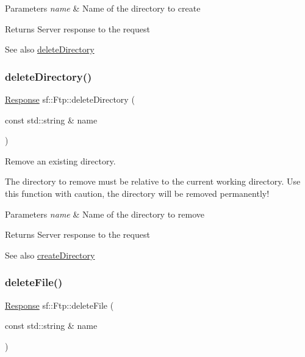 \begin{DoxyParams}{Parameters}
{\em name} & Name of the directory to create\\
\hline
\end{DoxyParams}
\begin{DoxyReturn}{Returns}
Server response to the request
\end{DoxyReturn}
\begin{DoxySeeAlso}{See also}
\hyperlink{classsf_1_1_ftp_a2a8a7ef9144204b5b319c9a4be8806c2}{delete\+Directory} 
\end{DoxySeeAlso}
\mbox{\label{classsf_1_1_ftp_a2a8a7ef9144204b5b319c9a4be8806c2}} 
\subsubsection{\texorpdfstring{delete\+Directory()}{deleteDirectory()}}
{\footnotesize\ttfamily \hyperlink{classsf_1_1_ftp_1_1_response}{Response} sf\+::\+Ftp\+::delete\+Directory (\begin{DoxyParamCaption}\item[{const std\+::string \&}]{name }\end{DoxyParamCaption})}



Remove an existing directory. 

The directory to remove must be relative to the current working directory. Use this function with caution, the directory will be removed permanently!


\begin{DoxyParams}{Parameters}
{\em name} & Name of the directory to remove\\
\hline
\end{DoxyParams}
\begin{DoxyReturn}{Returns}
Server response to the request
\end{DoxyReturn}
\begin{DoxySeeAlso}{See also}
\hyperlink{classsf_1_1_ftp_a247b84c4b25da37804218c2b748c4787}{create\+Directory} 
\end{DoxySeeAlso}
\mbox{\label{classsf_1_1_ftp_a8aa272b0eb7769a850006e70fcad370f}} 
\subsubsection{\texorpdfstring{delete\+File()}{deleteFile()}}
{\footnotesize\ttfamily \hyperlink{classsf_1_1_ftp_1_1_response}{Response} sf\+::\+Ftp\+::delete\+File (\begin{DoxyParamCaption}\item[{const std\+::string \&}]{name }\end{DoxyParamCaption})}



